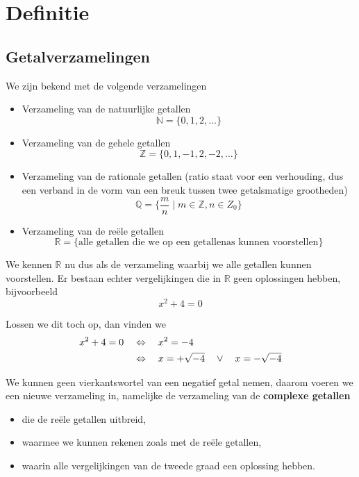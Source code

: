 \documentclass[12pt,twoside,a4paper]{article}
\begin{document}
\begin{singlespacing}
  \begin{small}
    \tableofcontents
  \end{small}
\end{singlespacing}
\thispagestyle{empty}
\pagebreak


\pagestyle{fancy}
\fancyhead[RE,LO]{}

\cleardoublepage
\section{Definitie}

\subsection{Getalverzamelingen}

We zijn bekend met de volgende verzamelingen
\begin{itemize}
  \item Verzameling van de natuurlijke getallen
  $$\mathbb{N}=\{0, 1, 2, \ldots\}$$
  \item Verzameling van de gehele getallen
  $$\mathbb{Z}=\{0, 1, -1, 2, -2, \ldots\}$$
  \item Verzameling van de rationale getallen (ratio staat voor een verhouding, dus een verband in de vorm van een breuk tussen twee getalsmatige grootheden)
  $$\mathbb{Q}=\{\frac{m}{n}\;|\;m\in\mathbb{Z}, n\in{Z}_0\}$$
  \item Verzameling van de reële getallen
  $$\mathbb{R}=\{\mbox{alle getallen die we op een getallenas kunnen voorstellen}\}$$
\end{itemize}

We kennen $\mathbb{R}$ nu dus als de verzameling waarbij we alle getallen kunnen voorstellen. Er bestaan echter vergelijkingen die in $\mathbb{R}$ geen oplossingen hebben, bijvoorbeeld
$$x^2+4=0$$

Lossen we dit toch op, dan vinden we
\begin{align*}
  x^2+4=0 \quad & \Leftrightarrow\quad x^2 = -4\\
             & \Leftrightarrow\quad x = +\sqrt{-4} \quad\vee\quad x = -\sqrt{-4}
\end{align*}

We kunnen geen vierkantswortel van een negatief getal nemen, daarom voeren we een nieuwe verzameling in, namelijke de verzameling van de {\bf complexe getallen}
\begin{itemize}
  \item die de reële getallen uitbreid,
  \item waarmee we kunnen rekenen zoals met de reële getallen,
  \item waarin alle vergelijkingen van de tweede graad een oplossing hebben.
\end{itemize}
\end{document}
